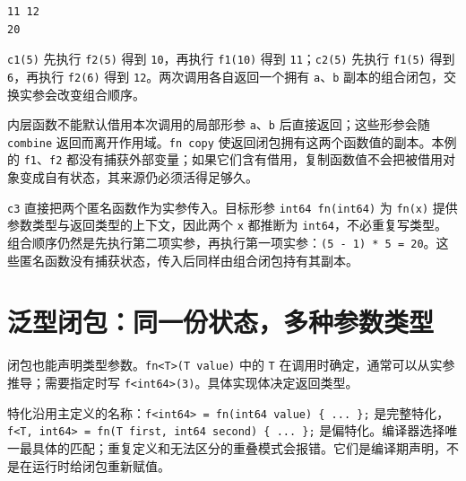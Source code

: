 \par
\medskip
\begin{lstlisting}[style=out]
11 12
20
\end{lstlisting}
\par
\medskip

\texttt{c1(\allowbreak{}5)\allowbreak{}} 先执行 \texttt{f2(\allowbreak{}5)\allowbreak{}} 得到 \texttt{10}，再执行 \texttt{f1(\allowbreak{}10)\allowbreak{}} 得到 \texttt{11}；\texttt{c2(\allowbreak{}5)\allowbreak{}} 先执行 \texttt{f1(\allowbreak{}5)\allowbreak{}} 得到 \texttt{6}，再执行 \texttt{f2(\allowbreak{}6)\allowbreak{}} 得到 \texttt{12}。两次调用各自返回一个拥有 \texttt{a}、\texttt{b} 副本的组合闭包，交换实参会改变组合顺序。

内层函数不能默认借用本次调用的局部形参 \texttt{a}、\texttt{b} 后直接返回；这些形参会随 \texttt{combine} 返回而离开作用域。\texttt{fn copy} 使返回闭包拥有这两个函数值的副本。本例的 \texttt{f1}、\texttt{f2} 都没有捕获外部变量；如果它们含有借用，复制函数值不会把被借用对象变成自有状态，其来源仍必须活得足够久。

\texttt{c3} 直接把两个匿名函数作为实参传入。目标形参 \texttt{int64 fn(\allowbreak{}int64)\allowbreak{}} 为 \texttt{fn(\allowbreak{}x)\allowbreak{}} 提供参数类型与返回类型的上下文，因此两个 \texttt{x} 都推断为 \texttt{int64}，不必重复写类型。组合顺序仍然是先执行第二项实参，再执行第一项实参：\texttt{(\allowbreak{}5 - 1)\allowbreak{} * 5 =\allowbreak{} 20}。这些匿名函数没有捕获状态，传入后同样由组合闭包持有其副本。

\section{泛型闭包：同一份状态，多种参数类型}

闭包也能声明类型参数。\texttt{fn<\allowbreak{}T>\allowbreak{}(\allowbreak{}T value)\allowbreak{}} 中的 \texttt{T} 在调用时确定，通常可以从实参推导；需要指定时写 \texttt{f<\allowbreak{}int64>\allowbreak{}(\allowbreak{}3)\allowbreak{}}。具体实现体决定返回类型。

特化沿用主定义的名称：\texttt{f<\allowbreak{}int64>\allowbreak{} =\allowbreak{} fn(\allowbreak{}int64 value)\allowbreak{} \{ .\allowbreak{}.\allowbreak{}.\allowbreak{} \};} 是完整特化，\texttt{f<\allowbreak{}T,\allowbreak{} int64>\allowbreak{} =\allowbreak{} fn(\allowbreak{}T first,\allowbreak{} int64 second)\allowbreak{} \{ .\allowbreak{}.\allowbreak{}.\allowbreak{} \};} 是偏特化。编译器选择唯一最具体的匹配；重复定义和无法区分的重叠模式会报错。它们是编译期声明，不是在运行时给闭包重新赋值。

